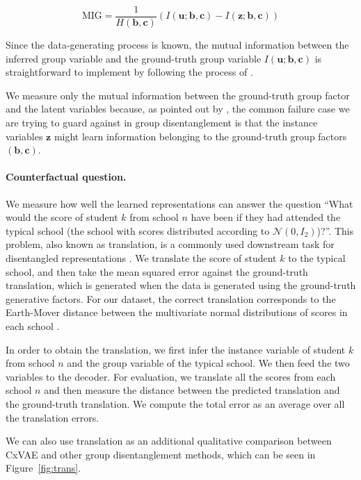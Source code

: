 \documentclass{article} %
\begin{document}
\begin{equation}
\mathrm{MIG} = \frac{1}{H(\mathbf{b}, \mathbf{c})} (I(\mathbf{u}; \mathbf{b}, \mathbf{c}) - I(\mathbf{z}; \mathbf{b}, \mathbf{c}))
\end{equation}

Since the data-generating process is known, the mutual information between the inferred group variable and the ground-truth group variable $I(\mathbf{u}; \mathbf{b}, \mathbf{c})$ is straightforward to implement by following the process of \citet{Chen2018IsolatingSO}.

We measure only the mutual information between the ground-truth group factor and the latent variables because,  as pointed out by \citet{Nmeth2020AdversarialDW}, the common failure case we are trying to guard against in group disentanglement is that the instance variables $\mathbf{z}$ might learn information belonging to the ground-truth group factors $(\mathbf{b}, \mathbf{c})$.

\paragraph{Counterfactual question.} We measure how well the learned representations can answer the question ``What would the score of student $k$ from school $n$ have been if they had attended the typical school (the school with scores distributed according to $\mathcal{N} (0, I_2)$)?''. This problem, also known as translation, is a commonly used downstream task for disentangled representations \citep{Tenenbaum2000SeparatingSA}. We translate the score of student $k$ to the typical school, and then take the mean squared error against the ground-truth translation, which is generated when the data is generated using the ground-truth generative factors. For our dataset, the correct translation corresponds to the Earth-Mover distance between the multivariate normal distributions of scores in each school \citep{Knott1984On}.

In order to obtain the translation, we first infer the instance variable of student $k$ from school $n$ and the group variable of the typical school. We then feed the two variables to the decoder. For evaluation, we translate all the scores from each school $n$ and then measure the distance between the predicted translation and the ground-truth translation. We compute the total error as an average over all the translation errors.

We can also use translation as an additional qualitative comparison between CxVAE and other group disentanglement methods, which can be seen in Figure~\ref{fig:trans}.
\end{document}
